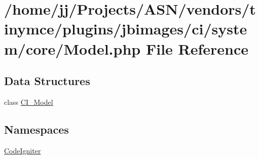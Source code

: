 \hypertarget{_model_8php}{}\section{/home/jj/\+Projects/\+A\+S\+N/vendors/tinymce/plugins/jbimages/ci/system/core/\+Model.php File Reference}
\label{_model_8php}
\subsection*{Data Structures}
\begin{DoxyCompactItemize}
\item 
class \hyperlink{class_c_i___model}{C\+I\+\_\+\+Model}
\end{DoxyCompactItemize}
\subsection*{Namespaces}
\begin{DoxyCompactItemize}
\item 
 \hyperlink{namespace_code_igniter}{Code\+Igniter}
\end{DoxyCompactItemize}

